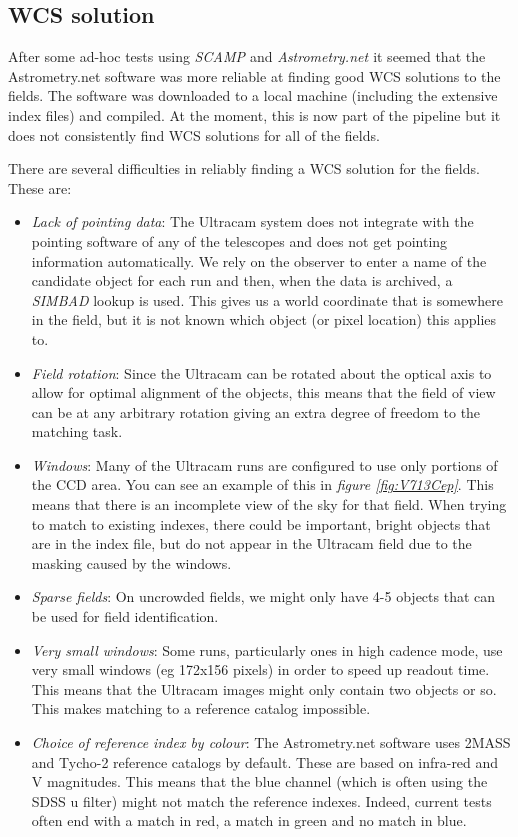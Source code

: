 \documentclass[a4paper,10pt]{article}
\begin{document}
\subsection{WCS solution}
After some ad-hoc tests using \emph{SCAMP \cite{scamp}} and \emph{Astrometry.net \cite{astrometry}} it seemed that the Astrometry.net software was more reliable at finding good WCS solutions to the fields. The software was downloaded to a local machine (including the extensive index files) and compiled. At the moment, this is now part of the pipeline but it does not consistently find WCS solutions for all of the fields. 

There are several difficulties in reliably finding a WCS solution for the fields.  These are:
\begin{itemize}
	\item \emph{Lack of pointing data}: The Ultracam system does not integrate with the pointing software of any of the telescopes and does not get pointing information automatically. We rely on the observer to enter a name of the candidate object for each run and then, when the data is archived, a \emph{SIMBAD} lookup is used. This gives us a world coordinate that is somewhere in the field, but it is not known which object (or pixel location) this applies to.  
	\item \emph{Field rotation}: Since the Ultracam can be rotated about the optical axis to allow for optimal alignment of the objects, this means that the field of view can be at any arbitrary rotation giving an extra degree of freedom to the matching task. 
	\item \emph{Windows}: Many of the Ultracam runs are configured to use only portions of the CCD area. You can see an example of this in \emph{figure \ref{fig:V713Cep}}. This means that there is an incomplete view of the sky for that field. When trying to match to existing indexes, there could be important, bright objects that are in the index file, but do not appear in the Ultracam field due to the masking caused by the windows.
	\item \emph{Sparse fields}: On uncrowded fields, we might only have 4-5 objects that can be used for field identification. 
	\item \emph{Very small windows}: Some runs, particularly ones in high cadence mode, use very small windows (eg 172x156 pixels) in order to speed up readout time. This means that the Ultracam images might only contain two objects or so. This makes matching to a reference catalog impossible. 
	\item \emph{Choice of reference index by colour}: The Astrometry.net software uses 2MASS and Tycho-2 reference catalogs by default. These are based on infra-red and V magnitudes. This means that the blue channel (which is often using the SDSS u filter) might not match the reference indexes. Indeed, current tests often end with a match in red, a match in green and no match in blue. 
\end{itemize}
\end{document}
